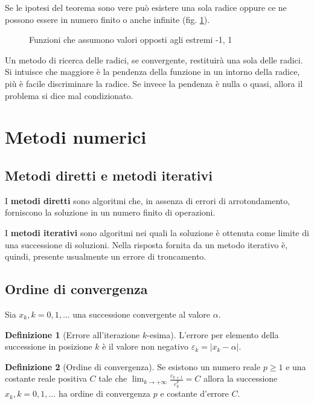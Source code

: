\documentclass[12pt]{article}
\theoremstyle{plain}%
\theoremstyle{definition}
\newtheorem{defn}{Definizione}[section]
\theoremstyle{remark}
\begin{document}
Se le ipotesi del teorema sono vere può esistere una sola radice oppure ce ne possono essere in numero finito o anche infinite (fig. \ref{fig:ipotesibolzano}).

\begin{figure}[ht]
    \centering
    
    \caption{Funzioni che assumono valori opposti agli estremi -1, 1}
    \label{fig:ipotesibolzano}
\end{figure}

Un metodo di ricerca delle radici, se convergente, restituirà una sola delle radici.
Si intuisce che maggiore è la pendenza della funzione in un intorno della radice, più è facile discriminare la radice. Se invece la pendenza è nulla o quasi, allora il problema si dice mal condizionato.

\section{Metodi numerici}

\subsection{Metodi diretti e metodi iterativi}

I \textbf{metodi diretti} sono algoritmi che, in assenza di errori di arrotondamento, forniscono la soluzione in un numero finito di operazioni.

I \textbf{metodi iterativi} sono algoritmi nei quali la soluzione è ottenuta come limite di una successione di soluzioni. Nella risposta fornita da un metodo iterativo è, quindi, presente usualmente un errore di troncamento.

\subsection{Ordine di convergenza}

Sia $x_k, k = 0, 1,\ldots$ una successione convergente al valore $\alpha$.

\begin{defn}[Errore all'iterazione $k$-esima]
L'errore per elemento della successione in posizione $k$ è il valore non negativo
$\varepsilon_k = |x_k - \alpha|$.
\end{defn}

\begin{defn}[Ordine di convergenza]
Se esistono un numero reale $p \geq 1$ e una costante reale positiva $C$
tale che
$\lim_{k\to+\infty} \frac{\varepsilon_{k+1}}{\varepsilon_{k}^p}=C$
allora la successione $x_k, k = 0, 1,\ldots$ ha ordine di convergenza $p$
e costante d'errore $C$.
\end{defn}
\end{document}
